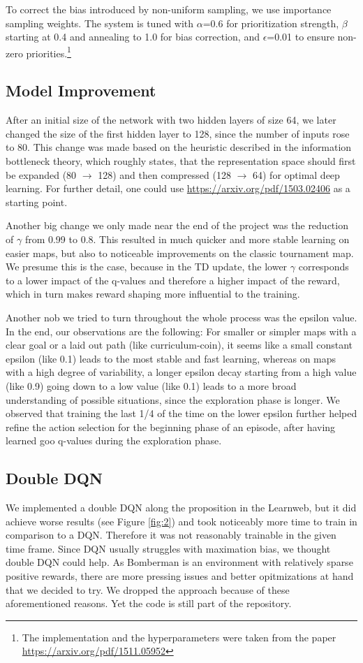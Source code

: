 \documentclass{article} %
\begin{document}
	To correct the bias introduced by non-uniform sampling, we use importance sampling weights. The system is tuned with $\alpha$=0.6 for prioritization strength, $\beta$ starting at 0.4 and annealing to 1.0 for bias correction, and $\epsilon$=0.01 to ensure non-zero priorities.\footnote{The implementation and the hyperparameters were taken from the paper \url{https://arxiv.org/pdf/1511.05952}}
	
	
	\subsection{Model Improvement}
	After an initial size of the network with two hidden layers of size 64, we later changed the size of the first hidden layer to 128, since the number of inputs rose to 80. This change was made based on the heuristic described in the information bottleneck theory, which roughly states, that the representation space should first be expanded (80 $\rightarrow$ 128) and then compressed (128 $\rightarrow$ 64) for optimal deep learning. For further detail, one could use \url{https://arxiv.org/pdf/1503.02406} as a starting point.
	
	Another big change we only made near the end of the project was the reduction of $\gamma$ from 0.99 to 0.8. This resulted in much quicker and more stable learning on easier maps, but also to noticeable improvements on the classic tournament map. We presume this is the case, because in the TD update, the lower $\gamma$ corresponds to a lower impact of the q-values and therefore a higher impact of the reward, which in turn makes reward shaping more influential to the training.
	
	Another nob we tried to turn throughout the whole process was the epsilon value. In the end, our observations are the following: For smaller or simpler maps with a clear goal or a laid out path (like curriculum-coin), it seems like a small constant epsilon (like 0.1) leads to the most stable and fast learning, whereas on maps with a high degree of variability, a longer epsilon decay starting from a high value (like 0.9) going down to a low value (like 0.1) leads to a more broad understanding of possible situations, since the exploration phase is longer. We observed that training the last 1/4 of the time on the lower epsilon further helped refine the action selection for the beginning phase of an episode, after having learned goo q-values during the exploration phase.
	
	\subsection{Double DQN}
	We implemented a double DQN along the proposition in the Learnweb, but it did achieve worse results (see Figure \ref{fig:2}) and took noticeably more time to train in comparison to a DQN. Therefore it was not reasonably trainable in the given time frame. Since DQN usually struggles with maximation bias, we thought double DQN could help. As Bomberman is an environment with relatively sparse positive rewards, there are more pressing issues and better opitmizations at hand that we decided to try. 
	We dropped the approach because of these aforementioned reasons. Yet the code is still part of the repository.
	
\end{document}

